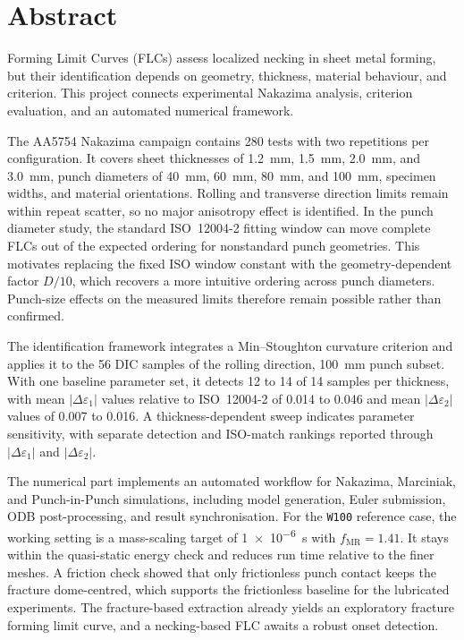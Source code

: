 
\chapter*{Abstract}

Forming Limit Curves (FLCs) assess localized necking in sheet metal forming,
but their identification depends on geometry, thickness, material behaviour,
and criterion. This project connects experimental Nakazima analysis, criterion
evaluation, and an automated numerical framework.

The AA5754 Nakazima campaign contains \num{280} tests with two repetitions per
configuration. It covers sheet thicknesses of \SI{1.2}{\milli\meter},
\SI{1.5}{\milli\meter}, \SI{2.0}{\milli\meter}, and
\SI{3.0}{\milli\meter}, punch diameters of \SI{40}{\milli\meter},
\SI{60}{\milli\meter}, \SI{80}{\milli\meter}, and
\SI{100}{\milli\meter}, specimen widths, and material orientations. Rolling
and transverse direction limits remain within repeat scatter, so no major
anisotropy effect is identified. In the punch diameter study, the standard
ISO~12004-2 fitting window can move complete FLCs out of the expected ordering
for nonstandard punch geometries. This motivates replacing the fixed ISO
window constant with the geometry-dependent factor $D/10$, which recovers a
more intuitive ordering across punch diameters. Punch-size effects on the
measured limits therefore remain possible rather than confirmed.

The identification framework integrates a Min--Stoughton curvature
criterion and applies it to the \num{56} DIC samples of the rolling direction,
\SI{100}{\milli\meter} punch subset. With one baseline parameter set, it
detects 12 to 14 of 14 samples per thickness, with mean
$|\Delta\varepsilon_1|$ values relative to ISO~12004-2 of \num{0.014} to \num{0.046}
and mean $|\Delta\varepsilon_2|$ values of \num{0.007} to \num{0.016}.
A thickness-dependent sweep indicates parameter sensitivity, with separate
detection and ISO-match rankings reported through
$|\Delta\varepsilon_1|$ and $|\Delta\varepsilon_2|$.

The numerical part implements an automated  workflow
for Nakazima, Marciniak, and Punch-in-Punch simulations, including model
generation, Euler submission, ODB post-processing, and result synchronisation.
For the \texttt{W100} reference case, the working setting is a mass-scaling
target of \SI{1e-6}{\second} with $f_\mathrm{MR}=1.41$. It stays within the
quasi-static energy check and
reduces run time relative to the finer meshes. A friction check showed that
only frictionless punch contact keeps the fracture
dome-centred, which supports the frictionless baseline for the lubricated
experiments. The fracture-based extraction already yields an exploratory
fracture forming limit curve, and a necking-based FLC awaits a robust onset
detection.

